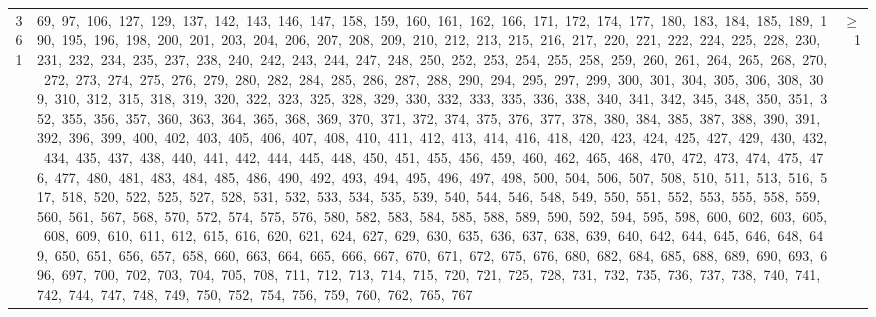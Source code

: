 \begin{longtable}{c|p{}|r}
361 & 69,\ 97,\ 106,\ 127,\ 129,\ 137,\ 142,\ 143,\ 146,\ 147,\ 158,\ 159,\ 160,\ 161,\ 162,\ 166,\ 171,\ 172,\ 174,\ 177,\ 180,\ 183,\ 184,\ 185,\ 189,\ 190,\ 195,\ 196,\ 198,\ 200,\ 201,\ 203,\ 204,\ 206,\ 207,\ 208,\ 209,\ 210,\ 212,\ 213,\ 215,\ 216,\ 217,\ 220,\ 221,\ 222,\ 224,\ 225,\ 228,\ 230,\ 231,\ 232,\ 234,\ 235,\ 237,\ 238,\ 240,\ 242,\ 243,\ 244,\ 247,\ 248,\ 250,\ 252,\ 253,\ 254,\ 255,\ 258,\ 259,\ 260,\ 261,\ 264,\ 265,\ 268,\ 270,\ 272,\ 273,\ 274,\ 275,\ 276,\ 279,\ 280,\ 282,\ 284,\ 285,\ 286,\ 287,\ 288,\ 290,\ 294,\ 295,\ 297,\ 299,\ 300,\ 301,\ 304,\ 305,\ 306,\ 308,\ 309,\ 310,\ 312,\ 315,\ 318,\ 319,\ 320,\ 322,\ 323,\ 325,\ 328,\ 329,\ 330,\ 332,\ 333,\ 335,\ 336,\ 338,\ 340,\ 341,\ 342,\ 345,\ 348,\ 350,\ 351,\ 352,\ 355,\ 356,\ 357,\ 360,\ 363,\ 364,\ 365,\ 368,\ 369,\ 370,\ 371,\ 372,\ 374,\ 375,\ 376,\ 377,\ 378,\ 380,\ 384,\ 385,\ 387,\ 388,\ 390,\ 391,\ 392,\ 396,\ 399,\ 400,\ 402,\ 403,\ 405,\ 406,\ 407,\ 408,\ 410,\ 411,\ 412,\ 413,\ 414,\ 416,\ 418,\ 420,\ 423,\ 424,\ 425,\ 427,\ 429,\ 430,\ 432,\ 434,\ 435,\ 437,\ 438,\ 440,\ 441,\ 442,\ 444,\ 445,\ 448,\ 450,\ 451,\ 455,\ 456,\ 459,\ 460,\ 462,\ 465,\ 468,\ 470,\ 472,\ 473,\ 474,\ 475,\ 476,\ 477,\ 480,\ 481,\ 483,\ 484,\ 485,\ 486,\ 490,\ 492,\ 493,\ 494,\ 495,\ 496,\ 497,\ 498,\ 500,\ 504,\ 506,\ 507,\ 508,\ 510,\ 511,\ 513,\ 516,\ 517,\ 518,\ 520,\ 522,\ 525,\ 527,\ 528,\ 531,\ 532,\ 533,\ 534,\ 535,\ 539,\ 540,\ 544,\ 546,\ 548,\ 549,\ 550,\ 551,\ 552,\ 553,\ 555,\ 558,\ 559,\ 560,\ 561,\ 567,\ 568,\ 570,\ 572,\ 574,\ 575,\ 576,\ 580,\ 582,\ 583,\ 584,\ 585,\ 588,\ 589,\ 590,\ 592,\ 594,\ 595,\ 598,\ 600,\ 602,\ 603,\ 605,\ 608,\ 609,\ 610,\ 611,\ 612,\ 615,\ 616,\ 620,\ 621,\ 624,\ 627,\ 629,\ 630,\ 635,\ 636,\ 637,\ 638,\ 639,\ 640,\ 642,\ 644,\ 645,\ 646,\ 648,\ 649,\ 650,\ 651,\ 656,\ 657,\ 658,\ 660,\ 663,\ 664,\ 665,\ 666,\ 667,\ 670,\ 671,\ 672,\ 675,\ 676,\ 680,\ 682,\ 684,\ 685,\ 688,\ 689,\ 690,\ 693,\ 696,\ 697,\ 700,\ 702,\ 703,\ 704,\ 705,\ 708,\ 711,\ 712,\ 713,\ 714,\ 715,\ 720,\ 721,\ 725,\ 728,\ 731,\ 732,\ 735,\ 736,\ 737,\ 738,\ 740,\ 741,\ 742,\ 744,\ 747,\ 748,\ 749,\ 750,\ 752,\ 754,\ 756,\ 759,\ 760,\ 762,\ 765,\ 767 & $\ge$ 1 \\

\end{longtable}
